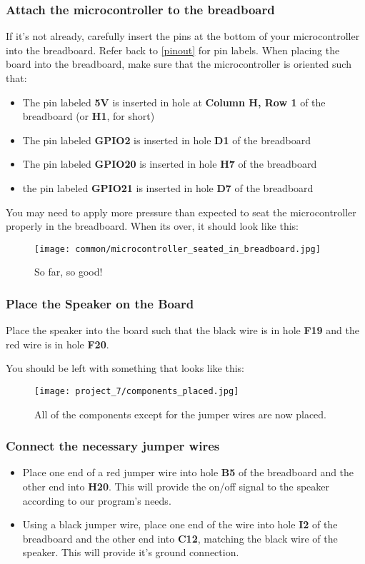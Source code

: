 \subsubsection{Attach the microcontroller to the breadboard}
If it's not already, carefully insert the pins at the bottom of your microcontroller into the breadboard. Refer back
to \ref{pinout} for pin labels. When placing the board into the breadboard, make sure that the microcontroller is oriented such that:
\begin{itemize}
    \item The pin labeled \textbf{5V} is inserted in hole at \textbf{Column H, Row 1} of the breadboard (or \textbf{H1}, for short)
    \item The pin labeled \textbf{GPIO2} is inserted in hole \textbf{D1} of the breadboard
    \item The pin labeled \textbf{GPIO20} is inserted in hole \textbf{H7} of the breadboard
    \item the pin labeled \textbf{GPIO21} is inserted in hole \textbf{D7} of the breadboard
\end{itemize}
You may need to apply more pressure than expected to seat the microcontroller properly in the breadboard. When its over, it should look like this:
\begin{figure}[H]
    \centering
    \texttt{[image: common/microcontroller\_seated\_in\_breadboard.jpg]}
    \caption{So far, so good!}
\end{figure}

\subsubsection{Place the Speaker on the Board}
Place the speaker into the board such that the black wire is in hole \textbf{F19}
and the red wire is in hole \textbf{F20}.

You should be left with something that looks like this:
\begin{figure}[H]
    \centering
    \texttt{[image: project\_7/components\_placed.jpg]}
    \caption{All of the components except for the jumper wires are now placed.}
\end{figure}

\subsubsection{Connect the necessary jumper wires}
\begin{itemize}
    \item Place one end of a red jumper wire into hole \textbf{B5} of the breadboard and the other end into
    \textbf{H20}. This will provide the on/off signal to the speaker according to our program's needs.
    \item Using a black jumper wire, place one end of the wire into hole \textbf{I2} of the breadboard and the other
    end into \textbf{C12}, matching the black wire of the speaker. This will provide it's ground connection.
\end{itemize}

